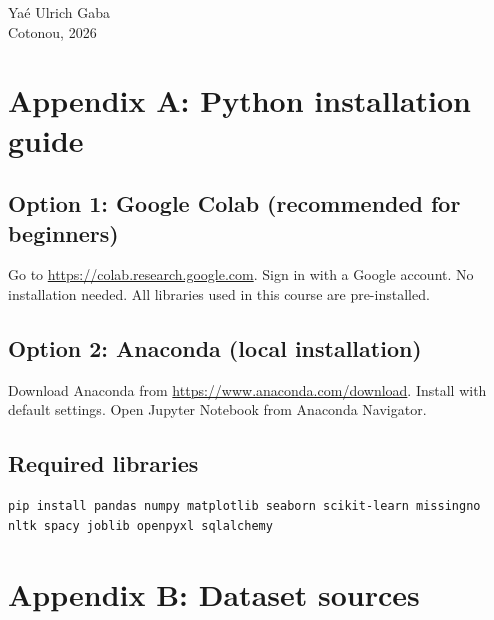 \documentclass[12pt,a4paper,twoside]{book}
\begin{document}
\vfill
\noindent Yaé Ulrich Gaba\\
Cotonou, 2026

\mainmatter












\backmatter

\chapter*{Appendix A: Python installation guide}

\section*{Option 1: Google Colab (recommended for beginners)}
Go to \url{https://colab.research.google.com}. Sign in with a Google account. No installation needed. All libraries used in this course are pre-installed.

\section*{Option 2: Anaconda (local installation)}
Download Anaconda from \url{https://www.anaconda.com/download}. Install with default settings. Open Jupyter Notebook from Anaconda Navigator.

\section*{Required libraries}
\begin{verbatim}
pip install pandas numpy matplotlib seaborn scikit-learn missingno nltk spacy joblib openpyxl sqlalchemy
\end{verbatim}

\chapter*{Appendix B: Dataset sources}
\end{document}
